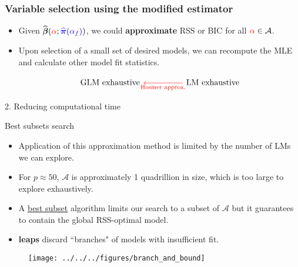 \documentclass[12pt,aspectratio=169]{beamer}
\newcommand{\bbetaHat}{\widehat{\boldsymbol{\beta}}}
\newcommand{\bPiHat}{\widehat{\boldsymbol{\pi}}}
\newcommand{\alphaFull}{\alpha_{f}}
\begin{document}
\begin{frame}[fragile] %
	\frametitle{Variable selection using the modified estimator}
	\begin{itemize}
		\item Given $ \bbetaHat({\color{red}\alpha}; {\color{blue}\bPiHat(\alphaFull)}) $, we could \textbf{approximate} RSS or BIC for all $ {\color{red}\alpha} \in \mathcal{A} $. 
		
		\item Upon selection of a small set of desired models, we can recompute the MLE and calculate other model fit statistics. 
		

\vspace{0.5cm}
\begin{equation*}
\begin{tikzcd}[column sep=huge]
\text{GLM exhaustive}
& \arrow[l, red, "\text{Hosmer approx.}", red] \text{LM exhaustive}
\end{tikzcd}
\end{equation*}

\end{itemize}

\end{frame}



\begin{frame}
\Huge{\color{themeBlue} 2. Reducing computational time}
\end{frame}


\begin{frame}{Best subsets search}
	\begin{itemize}
		
		\item Application of this approximation method is limited by the number of LMs we can explore.
		
		\item For $ p \approx 50 $, $ \mathcal{A}$ is approximately 1 quadrillion in size, which is too large to explore exhaustively. 
		
		\item A \underline{best subset} algorithm limits our search to a subset of $ \mathcal{A} $ but it guarantees to contain the global RSS-optimal model.
		
		\item \textbf{leaps} \citep{Furnival1974, Lumley2017} discard ``branches" of models with insufficient fit. 
	\end{itemize}

\begin{figure}
	\centering
	\texttt{[image: ../../../figures/branch\_and\_bound]}
	\label{fig:branchandbound}
\end{figure}
\end{frame}
\end{document}
